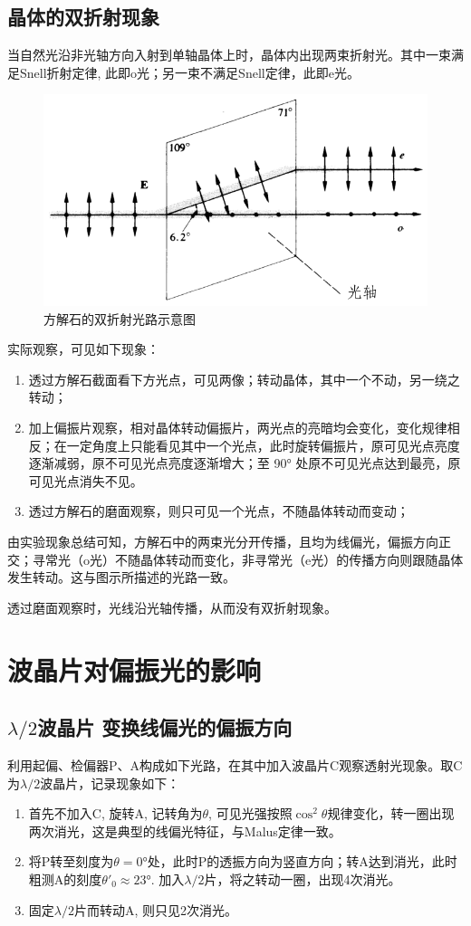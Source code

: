 \documentclass[a4paper,10pt]{article}
\begin{document}
\subsection{晶体的双折射现象}
	当自然光沿非光轴方向入射到单轴晶体上时，晶体内出现两束折射光。其中一束满足Snell折射定律, 此即o光；另一束不满足Snell定律，此即e光。
	\begin{figure}[!h]
	\centering
	\includegraphics[width=.55\linewidth]{birefringence}
	\caption{方解石的双折射光路示意图}
	\end{figure}\FloatBarrier
	实际观察，可见如下现象：
	\begin{enumerate}
	\item 透过方解石截面看下方光点，可见两像；转动晶体，其中一个不动，另一绕之转动；
	\item 加上偏振片观察，相对晶体转动偏振片，两光点的亮暗均会变化，变化规律相反；在一定角度上只能看见其中一个光点，此时旋转偏振片，原可见光点亮度逐渐减弱，原不可见光点亮度逐渐增大；至 \ang{90} 处原不可见光点达到最亮，原可见光点消失不见。
	\item 透过方解石的磨面观察，则只可见一个光点，不随晶体转动而变动；
	\end{enumerate}
	
	由实验现象总结可知，方解石中的两束光分开传播，且均为线偏光，偏振方向正交；寻常光（o光）不随晶体转动而变化，非寻常光（e光）的传播方向则跟随晶体发生转动。这与图示所描述的光路一致。
	
	透过磨面观察时，光线沿光轴传播，从而没有双折射现象。
\section{波晶片对偏振光的影响}
\subsection{\texorpdfstring{$\lambda/2$}{λ/2}波晶片
	变换线偏光的偏振方向}
	利用起偏、检偏器P、A构成如下光路，在其中加入波晶片C观察透射光现象。取C为$\lambda/2$波晶片，记录现象如下：
	\begin{enumerate}
	\item 首先不加入C, 旋转A, 记转角为$\theta$, 可见光强按照$\cos^2\theta$规律变化，转一圈出现两次消光，这是典型的线偏光特征，与Malus定律一致。
	\item 将P转至刻度为$\theta = \ang{0}$处，\textit{}此时P的透振方向为竖直方向；转A达到消光，此时粗测A的刻度$\theta'_0 \approx \ang{23}$. 加入$\lambda/2$片，将之转动一圈，出现4次消光。
	\item 固定$\lambda/2$片而转动A, 则只见2次消光。
	\end{enumerate}
	
\end{document}
